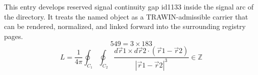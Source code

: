 
\begin{tzpsnapshot}
\end{tzpsnapshot}

This entry develops reserved signal continuity gap id1133 inside the signal arc of the directory. It treats the named object as a TRAWIN-admissible carrier that can be rendered, normalized, and linked forward into the surrounding registry pages.
\[
549=3\times183
\]
\[
L = \frac{1}{4\pi}\oint_{C_{1}}\oint_{C_{2}}\frac{d\vec{r} {1}\times d\vec{r} {2}\cdot(\vec{r} {1}-\vec{r} {2})}{|\vec{r} {1}-\vec{r} {2}|^{3}} \in \mathbb{Z}
\]

